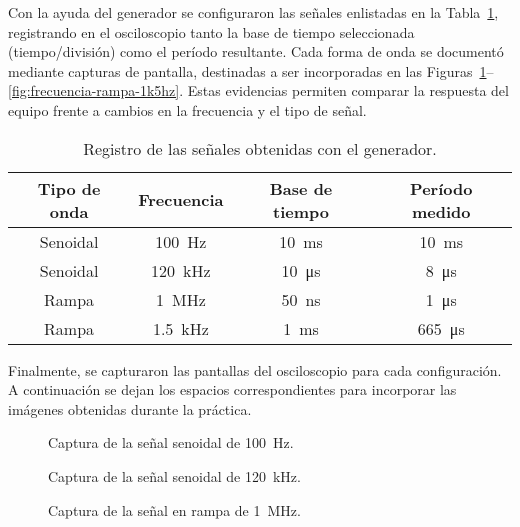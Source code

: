 \documentclass[conference]{IEEEtran} %
\begin{document}
Con la ayuda del generador se configuraron las señales enlistadas en la Tabla~\ref{tab:frecuencia}, registrando en el osciloscopio tanto la base de tiempo seleccionada (tiempo/división) como el período resultante. Cada forma de onda se documentó mediante capturas de pantalla, destinadas a ser incorporadas en las Figuras~\ref{fig:frecuencia-senoidal-100hz}--\ref{fig:frecuencia-rampa-1k5hz}. Estas evidencias permiten comparar la respuesta del equipo frente a cambios en la frecuencia y el tipo de señal.%
\begin{table}[H]
    \centering
    \caption{Registro de las señales obtenidas con el generador.}
    \label{tab:frecuencia}
    \begin{tabular}{|c|c|c|c|}
        \hline
        Tipo de onda & Frecuencia & Base de tiempo & Período medido \\ \hline
        Senoidal & \SI{100}{\hertz} & \SI{10}{\milli\second} & \SI{10}{\milli\second} \\ \hline
        Senoidal & \SI{120}{\kilo\hertz} & \SI{10}{\micro\second} & \SI{8}{\micro\second} \\ \hline
        Rampa & \SI{1}{\mega\hertz} & \SI{50}{\nano\second} & \SI{1}{\micro\second} \\ \hline
        Rampa & \SI{1.5}{\kilo\hertz} & \SI{1}{\milli\second} & \SI{665}{\micro\second} \\ \hline
    \end{tabular}
\end{table}%
Finalmente, se capturaron las pantallas del osciloscopio para cada configuración. A continuación se dejan los espacios correspondientes para incorporar las imágenes obtenidas durante la práctica.%
\begin{figure}[H]
    \centering
    \framebox[0.75\linewidth]{\rule{0pt}{3.5cm}}
    \caption{Captura de la señal senoidal de \SI{100}{\hertz}.}
    \label{fig:frecuencia-senoidal-100hz}
\end{figure}

\begin{figure}[H]
    \centering
    \framebox[0.75\linewidth]{\rule{0pt}{3.5cm}}
    \caption{Captura de la señal senoidal de \SI{120}{\kilo\hertz}.}
    \label{fig:frecuencia-senoidal-120khz}
\end{figure}

\begin{figure}[H]
    \centering
    \framebox[0.75\linewidth]{\rule{0pt}{3.5cm}}
    \caption{Captura de la señal en rampa de \SI{1}{\mega\hertz}.}
    \label{fig:frecuencia-rampa-1mhz}
\end{figure}
\end{document}
